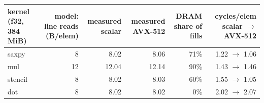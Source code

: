\begin{tabular}{lrrrrr}
\toprule
kernel (f32, 384 MiB) & model: line reads (B/elem) & measured scalar & measured AVX-512 & DRAM share of fills & cycles/elem scalar $\rightarrow$ AVX-512 \\
\midrule
saxpy & 8 & 8.02 & 8.06 & 71\% & 1.22 $\rightarrow$ 1.06 \\
mul & 12 & 12.04 & 12.14 & 90\% & 1.43 $\rightarrow$ 1.46 \\
stencil & 8 & 8.02 & 8.03 & 60\% & 1.55 $\rightarrow$ 1.05 \\
dot & 8 & 8.02 & 8.02 & 0\% & 2.02 $\rightarrow$ 2.07 \\
\bottomrule
\end{tabular}
